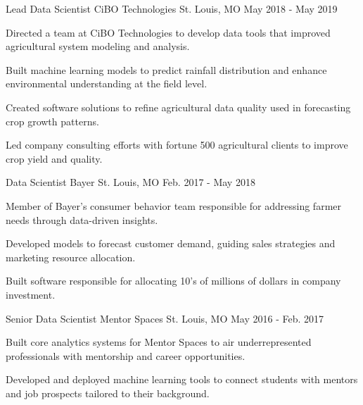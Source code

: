 \begin{cventries}
  \cventry
    {Lead Data Scientist} %
    {CiBO Technologies} %
    {St. Louis, MO} %
    {May 2018 - May 2019} %
    {
      \begin{cvitems} %
        \item {Directed a team at CiBO Technologies to develop data tools that improved agricultural system modeling and analysis.}
        \item {Built machine learning models to predict rainfall distribution and enhance environmental understanding at the field level.}
        \item {Created software solutions to refine agricultural data quality used in forecasting crop growth patterns.}
        \item {Led company consulting efforts with fortune 500 agricultural clients to improve crop yield and quality.}
      \end{cvitems}
    }

  \cventry
    {Data Scientist} %
    {Bayer} %
    {St. Louis, MO} %
    {Feb. 2017 - May 2018} %
    {
      \begin{cvitems} %
        \item {Member of Bayer's consumer behavior team responsible for addressing farmer needs through data-driven insights.}
        \item {Developed models to forecast customer demand, guiding sales strategies and marketing resource allocation.}
        \item {Built software responsible for allocating 10's of millions of dollars in company investment.}
      \end{cvitems}
    }

  \cventry
    {Senior Data Scientist} %
    {Mentor Spaces} %
    {St. Louis, MO} %
    {May 2016 - Feb. 2017} %
    {
      \begin{cvitems} %
        \item {Built core analytics systems for Mentor Spaces to air underrepresented professionals with mentorship and career opportunities.}
        \item {Developed and deployed machine learning tools to connect students with mentors and job prospects tailored to their background.}
      \end{cvitems}
    }


\end{cventries}
